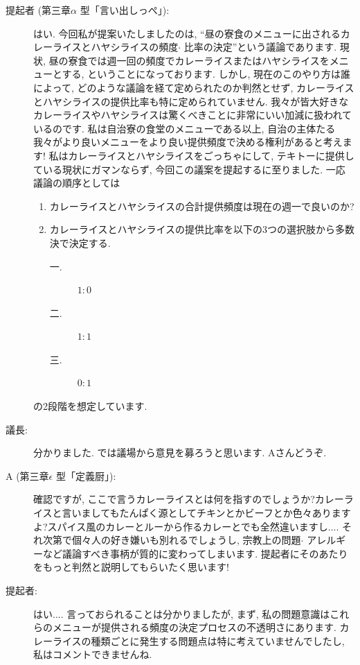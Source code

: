 \documentclass[10pt,b5jsbook,dvips,dvipdfmx,openany]{jsbook}
\theoremstyle{definition}
\begin{document}
\begin{multicols}{2}
\begin{description}
		\item[提起者 (第三章$ \alpha $ 型「言い出しっぺ」): ] はい. 今回私が提案いたしましたのは, ``昼の寮食のメニューに出されるカレーライスとハヤシライスの頻度$ \cdot $ 比率の決定''という議論であります. 現状, 昼の寮食では週一回の頻度でカレーライスまたはハヤシライスをメニューとする, ということになっております. しかし, 現在のこのやり方は誰によって, どのような議論を経て定められたのか判然とせず, カレーライスとハヤシライスの提供比率も特に定められていません. 我々が皆大好きなカレーライスやハヤシライスは驚くべきことに非常にいい加減に扱われているのです. 私は自治寮の食堂のメニューである以上, 自治の主体たる我々がより良いメニューをより良い提供頻度で決める権利があると考えます! 私はカレーライスとハヤシライスをごっちゃにして, テキトーに提供している現状にガマンならず, 今回この議案を提起するに至りました. 一応議論の順序としては

		\begin{enumerate}
		\item カレーライスとハヤシライスの合計提供頻度は現在の週一で良いのか?
		\item カレーライスとハヤシライスの提供比率を以下の3つの選択肢から多数決で決定する. 
			\begin{description}
			\item[一. ] $1:0$
			\item[二. ] $1:1$
			\item[三. ] $0:1$
			\end{description}
		\end{enumerate}
		の2段階を想定しています.

		\item[議長: ] 分かりました. では議場から意見を募ろうと思います. Aさんどうぞ. 

		\item[A (第三章$ \epsilon $ 型「定義厨」): ]確認ですが, ここで言うカレーライスとは何を指すのでしょうか?カレーライスと言いましてもたんぱく源としてチキンとかビーフとか色々ありますよ?スパイス風のカレーとルーから作るカレーとでも全然違いますし.... それ次第で個々人の好き嫌いも別れるでしょうし, 宗教上の問題$ \cdot $ アレルギーなど議論すべき事柄が質的に変わってしまいます. 提起者にそのあたりをもっと判然と説明してもらいたく思います! 

		\item[提起者: ]はい.... 言っておられることは分かりましたが, まず, 私の問題意識はこれらのメニューが提供される頻度の決定プロセスの不透明さにあります. カレーライスの種類ごとに発生する問題点は特に考えていませんでしたし, 私はコメントできませんね. 


\end{description}
\end{multicols}
\end{document}
